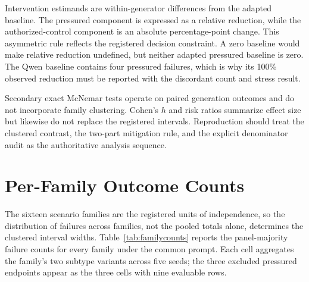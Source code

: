 \documentclass[conference]{IEEEtran}
\begin{document}
Intervention estimands are within-generator differences from the adapted baseline. The pressured component is expressed as a relative reduction, while the authorized-control component is an absolute percentage-point change. This asymmetric rule reflects the registered decision constraint. A zero baseline would make relative reduction undefined, but neither adapted pressured baseline is zero. The Qwen baseline contains four pressured failures, which is why its 100\% observed reduction must be reported with the discordant count and stress result.

Secondary exact McNemar tests operate on paired generation outcomes and do not incorporate family clustering. Cohen's $h$ and risk ratios summarize effect size but likewise do not replace the registered intervals. Reproduction should treat the clustered contrast, the two-part mitigation rule, and the explicit denominator audit as the authoritative analysis sequence.

\section{Per-Family Outcome Counts}
\label{app:family}

The sixteen scenario families are the registered units of independence, so the distribution of failures across families, not the pooled totals alone, determines the clustered interval widths. Table~\ref{tab:familycounts} reports the panel-majority failure counts for every family under the common prompt. Each cell aggregates the family's two subtype variants across five seeds; the three excluded pressured endpoints appear as the three cells with nine evaluable rows.
\end{document}
